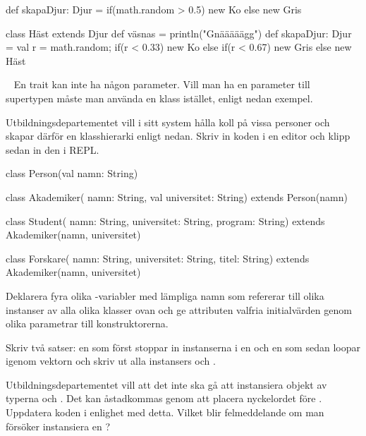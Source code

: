 \SOLUTION


\TaskSolved \what


\SubtaskSolved
\begin{Code}
def skapaDjur: Djur =
   {if(math.random > 0.5) new Ko else new Gris}
\end{Code}

\SubtaskSolved
\begin{Code}
class Häst extends Djur{ def väsnas = println("Gnääääägg") }
def skapaDjur: Djur = {val r = math.random;
   if(r < 0.33) new Ko else if(r < 0.67) new Gris else new Häst}
\end{Code}


\QUESTEND










\QUESTBEGIN

\Task  \what~  En trait kan inte ha någon parameter. Vill man ha en parameter till supertypen måste man använda en klass istället, enligt nedan exempel.

Utbildningsdepartementet vill i sitt system hålla koll på vissa personer och skapar därför en klasshierarki enligt nedan. Skriv in koden i en editor och klipp sedan in den i REPL.
\begin{Code}
class Person(val namn: String)

class Akademiker(
  namn: String,
  val universitet: String) extends Person(namn)

class Student(
  namn: String,
  universitet: String,
  program: String) extends Akademiker(namn, universitet)

class Forskare(
  namn: String,
  universitet: String,
  titel: String) extends Akademiker(namn, universitet)
\end{Code}


\Subtask Deklarera fyra olika -variabler med lämpliga namn som refererar till olika instanser av alla olika klasser ovan och ge attributen valfria initialvärden genom olika parametrar till konstruktorerna.

\Subtask Skriv två satser: en som först stoppar in instanserna i en  och en som sedan loopar igenom vektorn och skriv ut alla instansers  och .


\Subtask Utbildningsdepartementet vill att det inte ska gå att instansiera objekt av typerna  och . Det kan åstadkommas genom att placera nyckelordet  före . Uppdatera koden i enlighet med detta. Vilket blir felmeddelande om man försöker instansiera en ?

